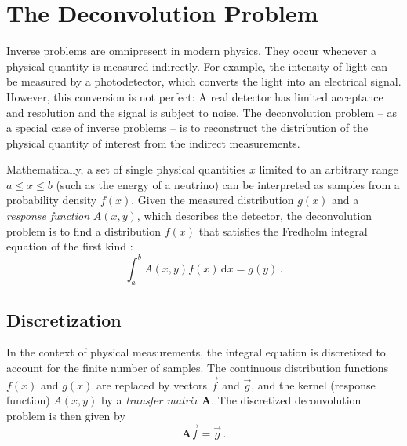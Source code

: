 \section{The Deconvolution Problem} %
Inverse problems are omnipresent in modern physics.
They occur whenever a physical quantity is measured indirectly.
For example,
the intensity of light can be measured by a photodetector,
  which converts the light into an electrical signal.
However,
this conversion is not perfect:
A real detector has limited acceptance and resolution
and the signal is subject to noise.
%
The deconvolution problem
  – as a special case of inverse problems –
  is to reconstruct
    the distribution of the physical quantity of interest
    from the indirect measurements.

Mathematically,
a set of single physical quantities $x$
  limited to an arbitrary range $a \leq x \leq b$
    (such as the energy of a neutrino)
can be interpreted as samples from a probability density $f(x)$.
%
Given
  the measured distribution $g(x)$
  and a \emph{response function} $A(x, y)$,
    which describes the detector,
the deconvolution problem is
  to find a distribution $f(x)$ that satisfies
  the Fredholm integral equation of the first kind \cite{deconvolution_blobel}:
\begin{equation}
  \label{eq:deconvolution_problem:fredholm}
  \int_a^b A(x, y) f(x) \, \mathrm{d}x = g(y) \, .
\end{equation}


\subsection{Discretization} \label{sec:dsea:deconvolution_problem:discretization}
In the context of physical measurements,
the integral equation is discretized
  to account for the finite number of samples.
The continuous distribution functions $f(x)$ and $g(x)$ are replaced by vectors $\vec{f}$ and $\vec{g}$,
and the kernel (response function) $A(x, y)$ by a \emph{transfer matrix} $\symbf{A}$.
%
The discretized deconvolution problem is then given by
\begin{equation}
  \label{eq:deconvolution_problem:discretized}
  \symbf{A} \vec{f} = \vec{g} \, .
\end{equation}

